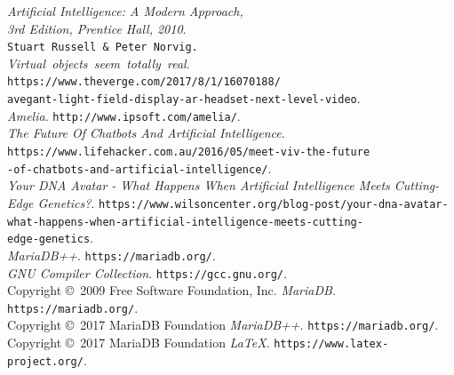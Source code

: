 \documentclass[a4paper, 12pt]{article}
\begin{document}
 	 	 \begin{thebibliography}{99}
 	 	 	{\itshape Artificial Intelligence: A Modern Approach, \\ 3rd Edition, Prentice Hall, 2010}. \\
 	 	 	\texttt{Stuart Russell \& Peter Norvig.} \\
   	        {\itshape Virtual\ objects\ seem\ totally\ real}.
            \texttt{https://www.theverge.com/2017/8/1/16070188/\\
            avegant-light-field-display-ar-headset-next-level-video}. \\
 	 	 	{\itshape Amelia}.
 	 	 	\texttt{http://www.ipsoft.com/amelia/}. \\
 	 	 	{\itshape The Future Of Chatbots And Artificial Intelligence}.
 	 	 	\texttt{https://www.lifehacker.com.au/2016/05/meet-viv-the-future\\
 	 	 		-of-chatbots-and-artificial-intelligence/}. \\
 	 	 	
 	 	 	{\itshape Your DNA Avatar - What Happens When Artificial Intelligence Meets Cutting-Edge Genetics?}.
 	 	 	\texttt{https://www.wilsoncenter.org/blog-post/your-dna-avatar-\\
 	 	 		    what-happens-when-artificial-intelligence-meets-cutting-\\
 	 	 		    edge-genetics}. \\
 	 	 	
 	 	 	{\itshape MariaDB++}.
 	 	 	\texttt{https://mariadb.org/}. \\
 	 	 	{\itshape GNU Compiler Collection}.
 	 	 	\texttt{https://gcc.gnu.org/}. \\
 	 	 	Copyright \copyright\  2009 Free Software Foundation, Inc.
 	 	 	{\itshape MariaDB}.
 	 	 	\texttt{https://mariadb.org/}. \\
 	 	 	Copyright \copyright\  2017 MariaDB Foundation
 	 	 	{\itshape MariaDB++}.
 	 	 	\texttt{https://mariadb.org/}. \\
 	 	 	Copyright \copyright\  2017 MariaDB Foundation
 	 	 	{\itshape \LaTeX}.
 	 	 	\texttt{https://www.latex-project.org/}.
 	 	 \end{thebibliography}
\end{document}
